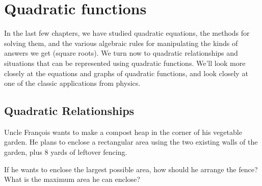 \chapter{Quadratic functions}
\label{ch:quadfunc}


In the last few chapters, we have studied quadratic equations, the methods for solving them, and the various algebraic rules for manipulating the kinds of answers we get (square roots). We turn now to quadratic relationships and situations that can be represented using quadratic functions. We'll look more closely at the equations and graphs of quadratic functions, and look closely at one of the classic applications from physics.

\section{Quadratic Relationships}
\label{sec:quadrelationships}


\begin{boxexplore}
Uncle Fran\c{c}ois wants to make a compost heap in the corner of his vegetable garden. He plans to enclose a rectangular area using the two existing walls of the garden, plus 8 yards of leftover fencing.

\begin{center}
\end{center}

If he wants to enclose the largest possible area, how should he arrange the fence? What is the maximum area he can enclose?
\end{boxexplore}

